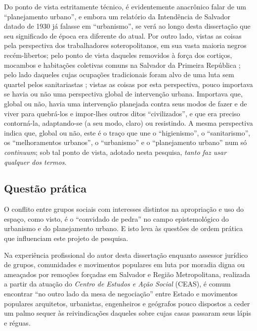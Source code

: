 Do ponto de vista estritamente técnico, é evidentemente anacrônico falar de um ``planejamento urbano'', e embora um relatório da Intendência de Salvador datado de 1930 já falasse em ``urbanismo'', se verá ao longo desta dissertação que seu significado de época era diferente do atual. Por outro lado, vistas as coisas pela perspectiva dos trabalhadores soteropolitanos, em sua vasta maioria negros recém-libertos; pelo ponto de vista daqueles removidos à força dos cortiços, mocambos e habitações coletivas comuns na Salvador da Primeira República \cite{cardoso1990proleta}; pelo lado daqueles cujas ocupações tradicionais foram alvo de uma luta sem quartel pelos sanitariastas \cite{barbosa2009}; vistas as coisas por esta perspectiva, pouco importava se havia ou não uma perspectiva global de intervenção urbana. Importava que, global ou não, havia uma intervenção planejada contra seus modos de fazer e de viver para quebrá-los e impor-lhes outros ditos ``civilizados'', e que era preciso contorná-la, adaptando-se (a seu modo, claro) ou resistindo. A mesma perspectiva indica que, global ou não, este é o traço que une o ``higienismo'', o ``sanitarismo'', os ``melhoramentos urbanos'', o ``urbanismo'' e o ``planejamento urbano'' num só \textit{continuum}; sob tal ponto de vista, adotado nesta pesquisa, \textit{tanto faz usar qualquer dos termos}. 

\subsection{Questão prática}
\label{subsec:questprat}

O conflito entre grupos sociais com interesses distintos na apropriação e uso do espaço, como visto, é o ``convidado de pedra'' no campo epistemológico do urbanismo e do planejamento urbano. E isto leva às questões de ordem prática que influenciam este projeto de pesquisa.

Na experiência profissional do autor desta dissertação enquanto assessor jurídico de grupos, comunidades e movimentos populares em luta por moradia digna ou ameaçados por remoções forçadas em Salvador e Região Metropolitana, realizada a partir da atuação do \textit{Centro de Estudos e Ação Social} (CEAS), é comum encontrar ``no outro lado da mesa de negociação'' entre Estado e movimentos populares arquitetos, urbanistas, engenheiros e geógrafos pouco dispostos a ceder um palmo sequer às reivindicações daqueles sobre cujas casas passaram seus lápis e réguas.


